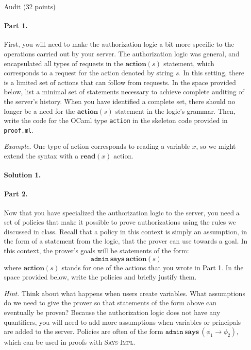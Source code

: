 \documentclass[11pt]{article}
\newcommand{\act}{\ensuremath{\mathbf{action}}\xspace}
\newcommand{\says}{\ensuremath{\mathbf{says}}\xspace}
\begin{document}
\begin{problem}{Audit (32 points)}
\paragraph{Part 1. } First, you will need to make the authorization logic a bit more specific to the operations carried out by your server. The authorization logic was general, and encapsulated all types of requests in the $\act(s)$ statement, which corresponds to a request for the action denoted by string $s$. In this setting, there is a limited set of actions that can follow from requests. In the space provided below, list a minimal set of statements necessary to achieve complete auditing of the server's history. When you have identified a complete set, there should no longer be a need for the $\act(s)$ statement in the logic's grammar. Then, write the code for the OCaml type \texttt{action} in the skeleton code provided in \texttt{proof.ml}.

\emph{Example.} One type of action corresponds to reading a variable $x$, so we might extend the syntax with a $\mathbf{read}(x)$ action.

\paragraph{Solution 1.}

\paragraph{Part 2. } Now that you have specialized the authorization logic to the server, you need a set of policies that make it possible to prove authorizations using the rules we discussed in class. Recall that a policy in this context is simply an assumption, in the form of a statement from the logic, that the prover can use towards a goal. In this context, the prover's goals will be statements of the form:
\[
\texttt{admin}\ \says\ \act(s)
\]
where $\act(s)$ stands for one of the actions that you wrote in Part 1. In the space provided below, write the policies and briefly justify them.

\emph{Hint.} Think about what happens when users create variables. What assumptions do we need to give the prover so that statements of the form above can eventually be proven? Because the authorization logic does not have any quantifiers, you will need to add more assumptions when variables or principals are added to the server. Policies are often of the form $\mathtt{admin}\ \says\  (\phi_1 \rightarrow \phi_2)$, which can be used in proofs with \textsc{Says-Impl}.


\end{problem}
\end{document}
